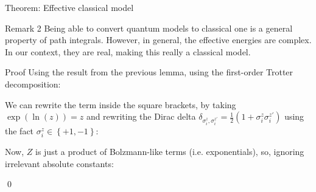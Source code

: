 \documentclass[a4paper]{article}
\begin{document}
\begin{parag}{Theorem: Effective classical model}
    \begin{subparag}{Remark 2}
        Being able to convert quantum models to classical one is a general property of path integrals. However, in general, the effective energies are complex. In our context, they are real, making this really a classical model.
    \end{subparag}

    \begin{subparag}{Proof}
        Using the result from the previous lemma, using the first-order Trotter decomposition: 

        We can rewrite the term inside the square brackets, by taking $\exp\left(\ln\left(z\right)\right) = z$ and rewriting the Dirac delta $\delta_{\sigma_i^z, \sigma_i^{z'}} = \frac{1}{2}\left(1 + \sigma_i^z \sigma_i^{z'}\right)$ using the fact $\sigma_i^z \in \left\{+1, -1\right\}$: 

        Now, $Z$ is just a product of Bolzmann-like terms (i.e. exponentials), so, ignoring irrelevant absolute constants: 

        \qed
    \end{subparag}
\end{parag}
\end{document}
